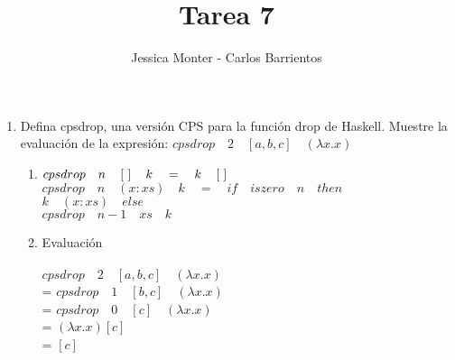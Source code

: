 \documentclass[a4paper]{article}
\date{}
\title{Tarea 7}
\author{Jessica Monter -  Carlos Barrientos}
\begin{document}
\maketitle



\begin{enumerate}
\item Defina cpsdrop, una versión CPS para la función drop de Haskell. Muestre la evaluación de la expresión: $ cpsdrop \quad 2 \quad \left[a,b,c\right] \quad (\lambda x.x) $

\begin{enumerate}
\item
$cpsdrop \quad n \quad \left[\hspace{3 pt} \right] \quad k \quad = \quad k \quad \left[\hspace{3 pt} \right]$
\\ $cpsdrop \quad n \quad (x:xs) \quad k \quad = \quad if \quad iszero \quad n \quad then $
\\ \hspace*{140 pt} $ k \quad (x:xs) \quad else $
\\ \hspace*{140 pt} $ cpsdrop \quad n-1 \quad xs \quad k $

\item Evaluación
\\
\\ $cpsdrop \quad 2 \quad \left[a,b,c\right] \quad (\lambda x.x) $
\\ = $cpsdrop \quad 1 \quad \left[b,c\right] \quad (\lambda x.x)$
\\ = $cpsdrop \quad 0 \quad \left[c\right] \quad (\lambda x.x)$
\\ = $(\lambda x.x) \left[c\right]$
\\ = $ \left[c\right] $


\end{enumerate}
\end{enumerate}
\end{document}
